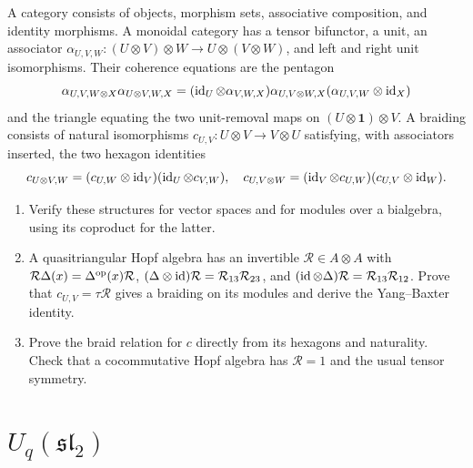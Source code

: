 \begin{exercise}
A category consists of objects, morphism sets, associative
composition, and identity morphisms. A monoidal category has a
tensor bifunctor, a unit, an associator
$\alpha_{U,V,W}:(U\otimes V)\otimes W\to U\otimes(V\otimes W)$,
and left and right unit isomorphisms. Their coherence equations
are the pentagon
\[
 \alpha_{U,V,W\otimes X}\alpha_{U\otimes V,W,X}
 =(\operatorname{id}_U\otimes\alpha_{V,W,X})\alpha_{U,V\otimes W,X}
                  (\alpha_{U,V,W}\otimes\operatorname{id}_X)
\]
and the triangle equating the two unit-removal maps on
$(U\otimes\mathbf1)\otimes V$.
A braiding consists of natural isomorphisms
$c_{U,V}:U\otimes V\to V\otimes U$ satisfying, with associators
inserted, the two hexagon identities
\[
 c_{U\otimes V,W}=(c_{U,W}\otimes\operatorname{id}_V)(\operatorname{id}_U\otimes c_{V,W}),
 \quad
 c_{U,V\otimes W}=(\operatorname{id}_V\otimes c_{U,W})(c_{U,V}\otimes\operatorname{id}_W).
\]
\begin{enumerate}[label=(\alph*)]
\item Verify these structures for vector spaces and for modules
over a bialgebra, using its coproduct for the latter.
\item A quasitriangular Hopf algebra has an invertible
$\mathcal R\in A\otimes A$ with
$\mathcal R\Delta(x)=\Delta^{\rm op}(x)\mathcal R$,
$(\Delta\otimes\operatorname{id})\mathcal R=\mathcal R_{13}\mathcal R_{23}$,
and $(\operatorname{id}\otimes\Delta)\mathcal R=\mathcal R_{13}\mathcal R_{12}$.
Prove that $c_{U,V}=\tau\mathcal R$ gives a braiding on its
modules and derive the Yang--Baxter identity.
\item Prove the braid relation for $c$ directly from its
hexagons and naturality. Check that a cocommutative Hopf algebra
has $\mathcal R=1$ and the usual tensor symmetry.
\end{enumerate}
\end{exercise}

\section{\texorpdfstring{$U_q(\mathfrak{sl}_2)$}{Uq(sl2)}}

